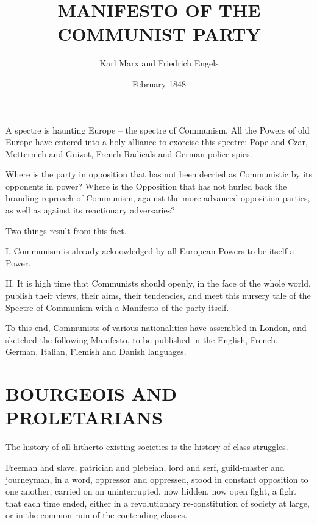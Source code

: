 \documentclass[, oneside]{article}   	%
\title{MANIFESTO OF THE COMMUNIST PARTY}
\author{Karl Marx and Friedrich Engels}
\date{February 1848}							%
\begin{document}
\maketitle


A spectre is haunting Europe -- the spectre of Communism.
All the Powers of old Europe have entered into a holy alliance to
exorcise this spectre: Pope and Czar, Metternich and Guizot,
French Radicals and German police-spies.

Where is the party in opposition that has not been decried as Communistic by its opponents in power? Where is the Opposition that has not hurled back the branding reproach of Communism, against the more advanced opposition parties, as well as against its reactionary adversaries?

Two things result from this fact.

I. Communism is already acknowledged by all European Powers to be itself a Power.

II. It is high time that Communists should openly, in the face of the whole world, publish their views, their aims, their tendencies, and meet this nursery tale of the Spectre of Communism with a Manifesto of the party itself.

To this end, Communists of various nationalities have assembled in London, and sketched the following Manifesto, to be published in the English, French, German, Italian, Flemish and Danish languages.

\section{BOURGEOIS AND PROLETARIANS}
The history of all hitherto existing societies is the history of class struggles.

Freeman and slave, patrician and plebeian, lord and serf, guild-master and journeyman, in a word, oppressor and oppressed, stood in constant opposition to one another, carried on an uninterrupted, now hidden, now open fight, a fight that each time ended, either in a revolutionary re-constitution of society at large, or in the common ruin of the contending classes.
\end{document}
